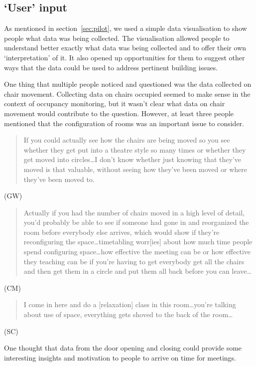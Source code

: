 \subsection{`User' input}
\label{sec:user-input}


As mentioned in section~\ref{sec:pilot}, we used a simple data
visualisation to show people what data was being collected. The
visualisation allowed people to understand better exactly what data
was being collected and to offer their own ‘interpretation’ of it. It
also opened up opportunities for them to suggest other ways that the
data could be used to address pertinent building issues.

One thing that multiple people noticed and questioned was the data
collected on chair movement. Collecting data on chairs occupied seemed
to make sense in the context of occupancy monitoring, but it wasn’t
clear what data on chair movement would contribute to the
question. However, at least three people mentioned that the
configuration of rooms was an important issue to consider.

\begin{quote}If you could actually see how the chairs are being moved so you see
whether they get put into a theatre style so many times or whether
they get moved into circles\ldots{}I don’t know whether just knowing that
they’ve moved is that valuable, without seeing how they’ve been moved
or where they’ve been moved to.\end{quote} (GW)

\begin{quote}Actually if you had the number of chairs moved in a high level of
detail, you’d probably be able to see if someone had gone in and
reorganized the room before everybody else arrives, which would show
if they’re reconfiguring the space\ldots timetabling worr[ies] about how
much time people spend configuring space\ldots{}how effective the meeting can
be or how effective they teaching can be if you’re having to get
everybody get all the chairs and then get them in a circle and put
them all back before you can leave\ldots{}\end{quote} (CM)

\begin{quote}I come in here and do a [relaxation] class in this room\ldots{}you’re
talking about use of space, everything gets shoved to the back of the
room\ldots \end{quote} (SC)

One thought that data from the door opening and closing could provide
some interesting insights and motivation to people to arrive on time
for meetings.

